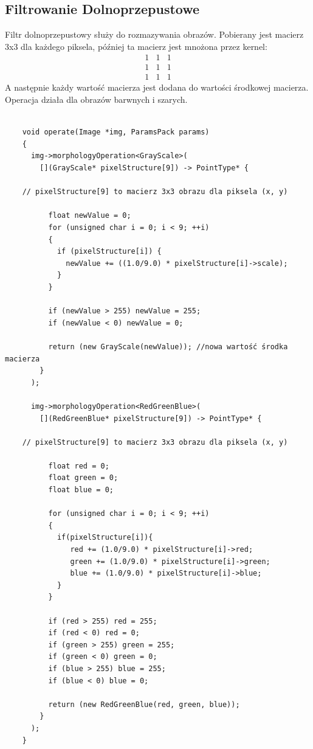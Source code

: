 \documentclass{article}
\begin{document}
\subsection{Filtrowanie Dolnoprzepustowe}
Filtr dolnoprzepustowy służy do rozmazywania obrazów. Pobierany jest macierz 3x3 dla każdego piksela, później ta macierz jest mnożona przez kernel:
\begin{equation*}
\begin{matrix}
1 & 1 & 1 \\
1 & 1 & 1 \\
1 & 1 & 1
\end{matrix}
\end{equation*}
A następnie każdy wartość macierza jest dodana do wartości środkowej macierza.
Operacja działa dla obrazów barwnych i szarych.\\
\begin{Verbatim}[frame=single,label=Filtr Dolnoprzepustowy (Source Code)]
    
    void operate(Image *img, ParamsPack params)
    {
      img->morphologyOperation<GrayScale>(
        [](GrayScale* pixelStructure[9]) -> PointType* {

	// pixelStructure[9] to macierz 3x3 obrazu dla piksela (x, y)

          float newValue = 0;
          for (unsigned char i = 0; i < 9; ++i)
          {
            if (pixelStructure[i]) {
              newValue += ((1.0/9.0) * pixelStructure[i]->scale);
            }
          }
          
          if (newValue > 255) newValue = 255;
          if (newValue < 0) newValue = 0;
          
          return (new GrayScale(newValue)); //nowa wartość środka macierza
        }
      );

      img->morphologyOperation<RedGreenBlue>(
        [](RedGreenBlue* pixelStructure[9]) -> PointType* {

	// pixelStructure[9] to macierz 3x3 obrazu dla piksela (x, y) 
	
          float red = 0;
          float green = 0;
          float blue = 0;

          for (unsigned char i = 0; i < 9; ++i)
          {
            if(pixelStructure[i]){
               red += (1.0/9.0) * pixelStructure[i]->red;
               green += (1.0/9.0) * pixelStructure[i]->green;
               blue += (1.0/9.0) * pixelStructure[i]->blue;
            }
          }
          
          if (red > 255) red = 255;
          if (red < 0) red = 0;
          if (green > 255) green = 255;
          if (green < 0) green = 0;
          if (blue > 255) blue = 255;
          if (blue < 0) blue = 0;
          
          return (new RedGreenBlue(red, green, blue));
        }
      );
    }
    
\end{Verbatim}
\end{document}
